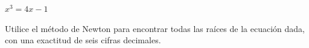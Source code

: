 \setcounter{enumi}{12}
\item $x^3 = 4x - 1$
\par
Utilice el método de Newton para encontrar todas las raíces de la ecuación dada, con una exactitud de seis cifras decimales.

